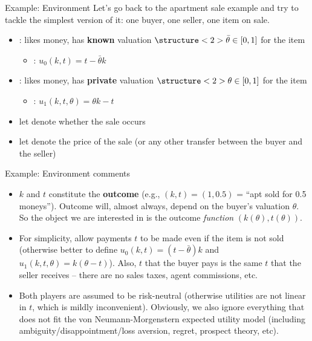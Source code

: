 \documentclass[english,10pt
,aspectratio=169
]{beamer}
\begin{document}
\begin{frame}{Example: Environment}
	Let's go back to the apartment sale example and try to tackle the simplest version of it: one buyer, one seller, one item on sale.
	\pause
	
	\begin{itemize}
		\item {}: likes money, has \textbf{known} valuation $\structure<2>{\bar{\theta}} \in [0,1]$ for the item
		\begin{itemize}[<4>]
			\item {}: $u_0(k,t) = t - \bar{\theta} k$
		\end{itemize}
		\item {}: likes money, has \textbf{private} valuation $\structure<2>{\theta} \in [0,1]$ for the item
		\begin{itemize}[<4>]
			\item {}: $u_1(k,t,\theta) = \theta k - t$
		\end{itemize}
		\pause
		\item let  denote whether the sale occurs
		\item let  denote the price of the sale (or any other transfer between the buyer and the seller)
	\end{itemize}
\end{frame}


\begin{frame}{Example: Environment comments}
	\begin{itemize}
		\item $k$ and $t$ constitute the \textbf{outcome} (e.g., $(k,t)=(1,0.5)$ = ``apt sold for 0.5 moneys''). Outcome will, almost always, depend on the buyer's valuation $\theta$. So the object we are interested in is the outcome \emph{function} $(k(\theta), t(\theta))$.
		
		\item For simplicity, allow payments $t$ to be made even if the item is not sold (otherwise better to define $u_0(k,t) = (t - \bar{\theta}) k$ and $u_1(k,t,\theta) = k (\theta - t)$). Also, $t$ that the buyer pays is the same $t$ that the seller receives -- there are no sales taxes, agent commissions, etc.
		
		\item Both players are assumed to be risk-neutral (otherwise utilities are not linear in $t$, which is mildly inconvenient). Obviously, we also ignore everything that does not fit the von Neumann-Morgenstern expected utility model (including ambiguity/disappointment/loss aversion, regret, prospect theory, etc).
	\end{itemize}
\end{frame}
\end{document}
